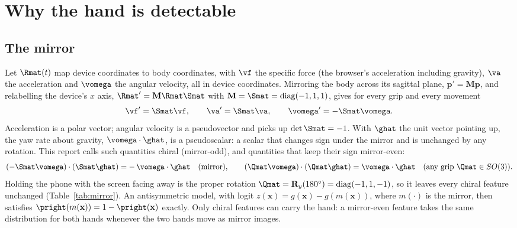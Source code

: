 \section{Why the hand is detectable}\label{sec:physics}

\subsection{The mirror}\label{sec:physics:mirror}
Let $\Rmat(t)$ map device coordinates to body coordinates, with $\vf$ the specific force (the
browser's acceleration including gravity), $\va$ the acceleration and $\vomega$ the angular
velocity, all in device coordinates. Mirroring the body across its sagittal plane, $\mathbf{p}' = \mathbf{M}\mathbf{p}$,
and relabelling the device's $x$ axis, $\Rmat' = \mathbf{M}\Rmat\Smat$ with
$\mathbf{M} = \Smat = \operatorname{diag}(-1, 1, 1)$, gives for every grip and every movement
\begin{equation}
  \vf' = \Smat\vf, \qquad \va' = \Smat\va, \qquad \vomega' = -\Smat\vomega .
  \label{eq:mirror}
\end{equation}
Acceleration is a polar vector; angular velocity is a pseudovector and picks up $\det\Smat = -1$.
With $\ghat$ the unit vector pointing up, the yaw rate about gravity, $\vomega\cdot\ghat$, is a pseudoscalar: a
scalar that changes sign under the mirror and is unchanged by any rotation. This report calls such quantities
chiral (mirror-odd), and quantities that keep their sign mirror-even:
\begin{equation}
  (-\Smat\vomega)\cdot(\Smat\ghat) = -\,\vomega\cdot\ghat
  \quad\text{(mirror)}, \qquad
  (\Qmat\vomega)\cdot(\Qmat\ghat) = \vomega\cdot\ghat
  \quad\text{(any grip } \Qmat \in SO(3)\text{)} .
  \label{eq:parity}
\end{equation}
Holding the phone with the screen facing away is the proper rotation
$\Qmat = \mathbf{R}_y(180^\circ) = \operatorname{diag}(-1, 1, -1)$, so it leaves every chiral feature
unchanged (Table~\ref{tab:mirror}). An antisymmetric model, with logit
$z(\mathbf{x}) = g(\mathbf{x}) - g(m(\mathbf{x}))$, where $m(\cdot)$ is the mirror, then satisfies
$\pright(m(\mathbf{x})) = 1 - \pright(\mathbf{x})$ exactly. Only chiral features can carry the hand: a mirror-even
feature takes the same distribution for both hands whenever the two hands move as mirror images.

